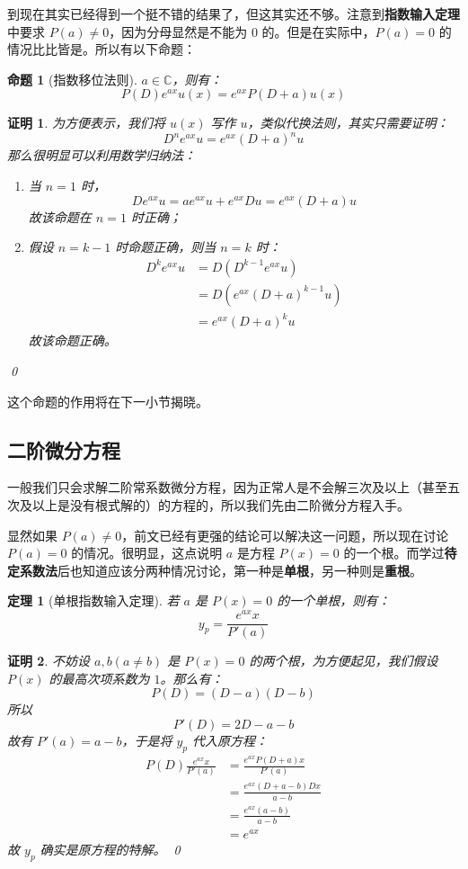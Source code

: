 \documentclass{article}
\newtheorem{thm}{定理}[section]
\newtheorem{prop}{命题}[section]
\newtheorem*{prf}{证明}
\begin{document}
\noindent 到现在其实已经得到一个挺不错的结果了，但这其实还不够。注意到\textbf{指数输入定理}中要求 $P(a) \neq 0$，因为分母显然是不能为 $0$ 的。但是在实际中，$P(a) = 0$ 的情况比比皆是。所以有以下命题：
\begin{prop}[指数移位法则]
$a\in \mathbb{C}$，则有：
$$
P(D)e^{ax}u(x) = e^{ax}P(D+a)u(x)
$$
\end{prop}
\begin{prf}
为方便表示，我们将 $u(x)$ 写作 $u$，类似代换法则，其实只需要证明：
$$
D^ne^{ax}u = e^{ax}(D+a)^nu
$$
那么很明显可以利用数学归纳法：
\begin{enumerate}[(1)]
    \item 当 $n=1$ 时，
$$
De^{ax}u = ae^{ax}u + e^{ax}Du = e^{ax}(D+a)u
$$
故该命题在 $n=1$ 时正确；
    \item 假设 $n = k-1$ 时命题正确，则当 $n=k$ 时：
\begin{align*}
    D^ke^{ax}u &= D(D^{k-1}e^{ax}u)\\
    &= D(e^{ax}(D+a)^{k-1}u)\\
    &= e^{ax}(D+a)^{k}u
\end{align*}
故该命题正确。
\end{enumerate}
\qed
\end{prf}

\noindent 这个命题的作用将在下一小节揭晓。

\subsection{二阶微分方程}

\noindent 一般我们只会求解二阶常系数微分方程，因为正常人是不会解三次及以上（甚至五次及以上是没有根式解的）的方程的，所以我们先由二阶微分方程入手。

\noindent 显然如果 $P(a) \neq 0$，前文已经有更强的结论可以解决这一问题，所以现在讨论 $P(a) = 0$ 的情况。很明显，这点说明 $a$ 是方程 $P(x)=0$ 的一个根。而学过\textbf{待定系数法}后也知道应该分两种情况讨论，第一种是\textbf{单根}，另一种则是\textbf{重根}。

\begin{thm}[单根指数输入定理]
若 $a$ 是 $P(x) = 0$ 的一个单根，则有：
$$
y_p = \frac{e^{ax}x}{P'(a)}
$$
\end{thm}
\begin{prf}
\noindent 不妨设 $a,b(a\neq b)$ 是 $P(x) = 0$ 的两个根，为方便起见，我们假设 $P(x)$ 的最高次项系数为 $1$。那么有：
$$
P(D) = (D-a)(D-b)
$$
所以
$$
P'(D) = 2D - a - b
$$
故有 $P'(a) = a - b$，于是将 $y_p$ 代入原方程：
\begin{align*}
P(D)\frac{e^{ax}x}{P'(a)} &= \frac{e^{ax}P(D+a)x}{P'(a)}\\
&= \frac{e^{ax}(D+a-b)Dx}{a - b}\\
&= \frac{e^{ax}(a-b)}{a-b}\\
&= e^{ax}
\end{align*}
故 $y_p$ 确实是原方程的特解。
    \qed
\end{prf}
\end{document}
